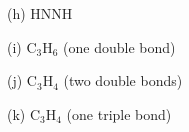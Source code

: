 \documentclass{article}[11pt]
\begin{document}
\newline
\begin{center}  \end{center}
\newline
\newline
(h) HNNH
\newline
\newline
\begin{center}  \end{center}
\newline
\newline
(i) C$_{3}$H$_{6}$ (one double bond)
\newline
\newline
\begin{center}  \end{center}
\newline
\newline
(j) C$_{3}$H$_{4}$ (two double bonds)
\newline
\newline
\begin{center}  \end{center}
\newline
\newline
(k) C$_{3}$H$_{4}$ (one triple bond)
\newline
\newline
\begin{center}  \end{center}
\newline
\newline
\end{document}
